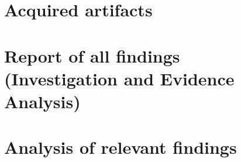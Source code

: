 \documentclass[11pt,a4paper,final,oneside]{article}
\begin{document}
\clearpage

\section{Acquired artifacts}
\label{sec:acquired_artifacts}



\section{Report of all findings (Investigation and Evidence Analysis)}
\label{sec:report-of-all-findings}

%
%


\section{Analysis of relevant findings}
\label{sec:analysis-of-relevant-findings}
\end{document}

